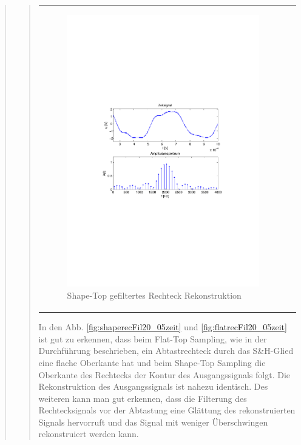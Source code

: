 \begin{quote}
\begin{quote}
\begin{center}
\begin{tabular}{ll}
                \begin{minipage}{0.6\textwidth}
                    \begin{figure}[H]
                        \includegraphics[scale=0.7, trim = 35mm 100mm 35mm 95mm, clip]{Bilder/shaperecFil20_05}
                       \caption{Shape-Top gefiltertes Rechteck Rekonstruktion}
		              \label{fig:shaperecFil20_05}
                    \end{figure}
                \end{minipage}
            
            \end{tabular}
            \end{center}
       
       In den Abb. \ref{fig:shaperecFil20_05zeit} und \ref{fig:flatrecFil20_05zeit} ist gut zu erkennen, dass beim
       Flat-Top Sampling, wie in der Durchführung beschrieben, ein Abtastrechteck durch das S\&H-Glied eine flache
       Oberkante hat und beim Shape-Top Sampling die Oberkante des Rechtecks der Kontur des Ausgangssignals folgt. 
       Die Rekonstruktion des Ausgangssignals ist nahezu identisch.
       Des weiteren kann man gut erkennen, dass die Filterung des Rechtecksignals vor der Abtastung eine Glättung des
       rekonstruierten Signals hervorruft und das Signal mit weniger Überschwingen rekonstruiert werden kann.
       

\end{quote}
\end{quote}

